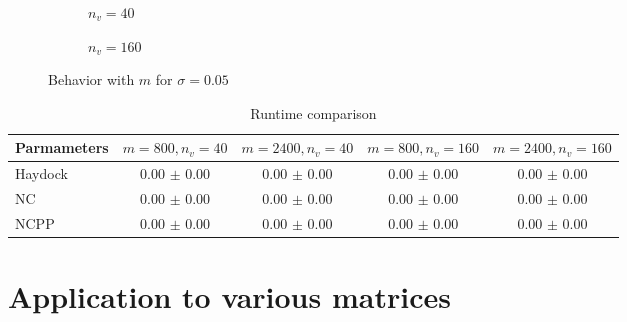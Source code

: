 \begin{figure}[ht]
    \centering
    \begin{subfigure}[b]{0.45\columnwidth}
        
        \caption{$n_v=40$}
        \label{fig:5-experiments-haydock-convergence-m-nv40}
    \end{subfigure}
    \begin{subfigure}[b]{0.5\columnwidth}
        
        \caption{$n_v=160$}
        \label{fig:5-experiments-haydock-convergence-m-nv160}
    \end{subfigure}
    \caption{Behavior with $m$ for $\sigma=0.05$}
    \label{fig:5-experiments-haydock-convergence-m}
\end{figure}

\begin{table}[h]
    \caption{Runtime comparison}
    \label{tab:5-experiments-haydock-runtime}
    \centering
    \renewcommand{\arraystretch}{1.2}
    \begin{tabular}{@{}lcccc@{}}
        \toprule
        Parmameters & $m=800,n_v=40$ & $m=2400,n_v=40$ & $m=800,n_v=160$ & $m=2400,n_v=160$ \\
        \midrule
        Haydock & 0.00 $\pm$ 0.00 & 0.00 $\pm$ 0.00 & 0.00 $\pm$ 0.00 & 0.00 $\pm$ 0.00 \\
        \gls{NC} & 0.00 $\pm$ 0.00 & 0.00 $\pm$ 0.00 & 0.00 $\pm$ 0.00 & 0.00 $\pm$ 0.00 \\
        \gls{NCPP} & 0.00 $\pm$ 0.00 & 0.00 $\pm$ 0.00 & 0.00 $\pm$ 0.00 & 0.00 $\pm$ 0.00 \\
        \bottomrule
    \end{tabular}
\end{table}

\section{Application to various matrices}
\label{sec:5-experiments-various-matrices}


